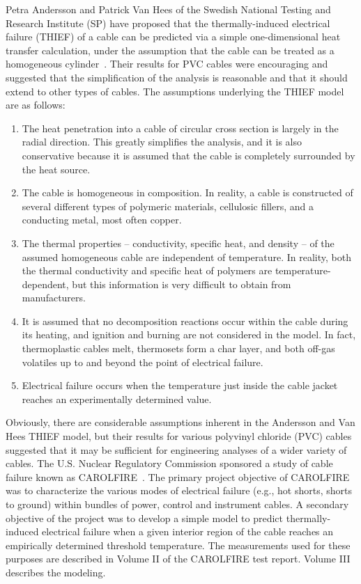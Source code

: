 \documentclass[11pt]{book}
\begin{document}
Petra Andersson and Patrick Van Hees of the Swedish National Testing and Research Institute
(SP) have proposed that the thermally-induced electrical failure (THIEF) of a cable can be predicted
via a simple one-dimensional heat transfer calculation, under the assumption that the cable can
be treated as a homogeneous cylinder~\cite{Andersson:2005}. Their results for PVC
cables were encouraging and suggested that the simplification of the analysis is reasonable and
that it should extend to other types of cables. The assumptions underlying the THIEF model are as follows:
\begin{enumerate}
\item The heat penetration into a cable of circular cross section is largely in the radial direction.
This greatly simplifies the analysis, and it is also conservative because it is assumed that
the cable is completely surrounded by the heat source.
\item The cable is homogeneous in composition. In reality, a cable is constructed of several
different types of polymeric materials, cellulosic fillers, and a conducting metal, most
often copper.
\item The thermal properties -- conductivity, specific heat, and density -- of the assumed
homogeneous cable are independent of temperature. In reality, both the thermal
conductivity and specific heat of polymers are temperature-dependent, but this
information is very difficult to obtain from manufacturers.
\item It is assumed that no decomposition reactions occur within the cable during its heating,
and ignition and burning are not considered in the model. In fact, thermoplastic cables
melt, thermosets form a char layer, and both off-gas volatiles up to and beyond the point
of electrical failure.
\item Electrical failure occurs when the temperature just inside the cable jacket reaches an
experimentally determined value.
\end{enumerate}
Obviously, there are considerable assumptions inherent in the Andersson and Van Hees THIEF
model, but their results for various polyvinyl chloride (PVC) cables suggested that it may be
sufficient for engineering analyses of a wider variety of cables. The U.S. Nuclear Regulatory
Commission sponsored a study of cable failure known as CAROLFIRE~\cite{CAROLFIRE}. The primary project objective of CAROLFIRE was to
characterize the various modes of electrical
failure (e.g., hot shorts, shorts to ground) within bundles of power, control and instrument cables.
A secondary objective of the project was to develop a simple model to predict thermally-induced
electrical failure when a given interior region of the cable reaches an empirically
determined threshold temperature. The measurements used for these purposes are described in
Volume II of the CAROLFIRE test report. Volume III describes the modeling.
\end{document}
